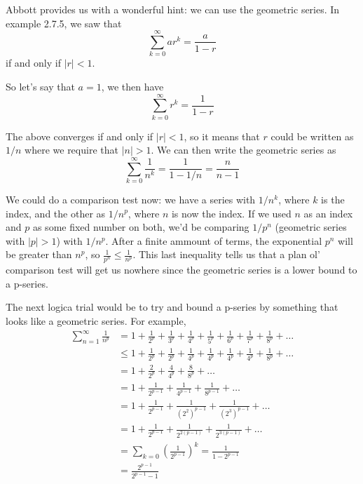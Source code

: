Abbott provides us with a wonderful hint: we can use the geometric series.
In example 2.7.5, we saw that
$$
\sum^{\infty}_{k=0} ar^k = \frac{a}{1-r}
$$
if and only if $|r| < 1$.

So let's say that $a=1$, we then have
$$
\sum^{\infty}_{k=0} r^k = \frac{1}{1-r}
$$

The above converges if and only if $|r|<1$, so it means that $r$ could be written as
$1/n$ where we require that $|n|>1$.
We can then write the geometric series as
$$
\sum^{\infty}_{k=0} \frac{1}{n^k} = \frac{1}{1-1/n} = \frac{n}{n-1}
$$

We could do a comparison test now: we have a series with $1/n^k$, where $k$ is the index,
and the other as $1/n^p$, where $n$ is now the index.
If we used $n$ as an index and $p$ as some fixed number on both, we'd be comparing
$1/p^n$ (geometric series with $|p|>1$) with $1/n^p$.
After a finite ammount of terms, the exponential $p^n$ will be greater than $n^p$,
so $\frac{1}{p^n} \leq \frac{1}{n^p}$.
This last inequality tells us that a plan ol' comparison test will get us nowhere since the geometric
series is a lower bound to a p-series.

The next logica trial would be to try and bound a p-series by something that looks like a
geometric series.
For example,
\begin{align*}
\sum^{\infty}_{n=1} \frac{1}{n^p} &= 1 + \frac{1}{2^p} + \frac{1}{3^p} + \frac{1}{4^p} + \frac{1}{5^p} + \frac{1}{6^p} + \frac{1}{7^p} + \frac{1}{8^p} + \ldots \\
& \leq 1 + \frac{1}{2^p} + \frac{1}{2^p} + \frac{1}{4^p} + \frac{1}{4^p} + \frac{1}{4^p} + \frac{1}{4^p} + \frac{1}{8^p} + \ldots \\
&= 1 + \frac{2}{2^p} + \frac{4}{4^p} + \frac{8}{8^p} + \ldots \\
&= 1 + \frac{1}{2^{p-1}} + \frac{1}{4^{p-1}} + \frac{1}{8^{p-1}} + \ldots \\
&= 1 + \frac{1}{2^{p-1}} + \frac{1}{(2^2)^{p-1}} + \frac{1}{(2^3)^{p-1}} + \ldots \\
&= 1 + \frac{1}{2^{p-1}} + \frac{1}{2^{2(p-1)}} + \frac{1}{2^{3(p-1)}} + \ldots \\
&= \sum_{k=0} \left( \frac{1}{2^{p-1}} \right)^k = \frac{1}{1 - 2^{p-1}} \\
&= \frac{2^{p-1}}{2^{p-1} - 1} 
\end{align*}
\\~\\



